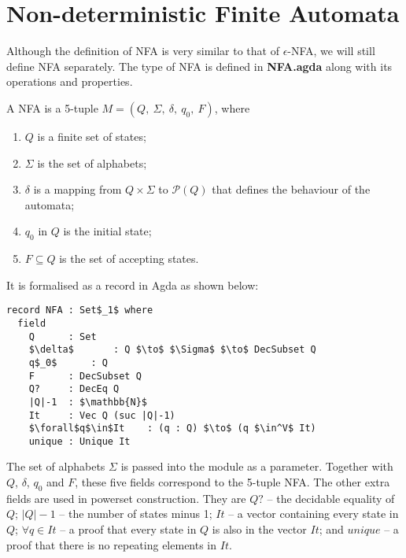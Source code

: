 \section{Non-deterministic Finite Automata}
\par Although the definition of NFA is very similar to that of
\(\epsilon\)-NFA, we will still define NFA
separately. The type of NFA is defined in \textbf{NFA.agda} along with
its operations and properties. 

\begin{defn}
\noindent A NFA is a 5-tuple \(M = (Q
,\ \Sigma,\ \delta,\ q_0,\ F)\), where
\begin{enumerate}[nolistsep]
  \item \(Q\) is a finite set of states;
  \item \(\Sigma\) is the set of alphabets;
  \item \(\delta\) is a mapping from \(Q \times \Sigma\) to
    \(\mathcal P \left({Q}\right)\) that defines the behaviour of the automata;
  \item \(q_0\) in \(Q\) is the initial state;
  \item \(F \subseteq Q\) is the set of accepting states. 
\end{enumerate}
\end{defn}

\par It is formalised as a record in Agda as shown below: 

\begin{lstlisting}[mathescape=true,xleftmargin=.25\textwidth]
record NFA : Set$_1$ where
  field
    Q      : Set
    $\delta$       : Q $\to$ $\Sigma$ $\to$ DecSubset Q
    q$_0$      : Q
    F      : DecSubset Q
    Q?     : DecEq Q
    |Q|-1  : $\mathbb{N}$
    It     : Vec Q (suc |Q|-1)
    $\forall$q$\in$It    : (q : Q) $\to$ (q $\in^V$ It)
    unique : Unique It
\end{lstlisting}

\par The set of alphabets \(\Sigma\) is passed into the module as a
parameter. Together with \(Q\), \(\delta\),
\(q_0\) and \(F\), these five fields correspond to the 5-tuple
NFA. The other extra fields are used in powerset construction. They
are \(Q?\) -- the decidable equality of \(Q\);
\(|Q|-1\) -- the number of states minus 1; \(It\) -- a vector containing every state in \(Q\); \(\forall q\in It\)
-- a proof that every state in \(Q\) is also in the vector
\(It\); and \(unique\) -- a proof that there is no repeating elements in
\(It\). 

